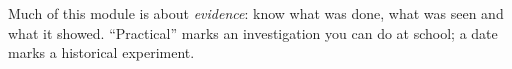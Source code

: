 \label{kx:chap}

\newcommand\kxhead{\colhead{Experiment} & \colhead{What was done} & \colhead{What it showed} &
  \colhead{Ch.}}
\newcommand\kxrow[4]{\textbf{#1} & #2 & #3 & \hyperref[ch#4:chap]{\textbf{#4}}\\\hline}
\newcommand\kxnext{\noalign{\vskip-0.4pt{\color{hscbrand!45}\hrule height 0.9pt}}}

Much of this module is about \emph{evidence}: know what was done, what was seen and what it
showed. ``Practical'' marks an investigation you can do at school; a date marks a historical
experiment.

